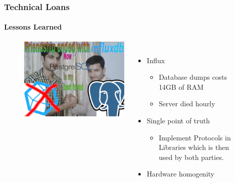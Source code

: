 
\begin{frame}
  \frametitle{Technical Loans}
  \framesubtitle{Lessons Learned}

\begin{figure}
\begin{columns}
\begin{center}
\includegraphics[height=0.65\textheight]{figs/meme_postgres_influx.png}
\end{center}
\raggedright
\vspace{0.5cm}

\begin{itemize}
  \item Influx
        \begin{itemize}
          \item Database dumps costs 14GB of RAM
          \item Server died hourly
        \end{itemize}
    \item Single point of truth
    \begin{itemize}
        \item Implement Protocols in Libraries which is then used by both parties.
    \end{itemize}
    \item Hardware homogenity
\end{itemize}
\end{columns}
\end{figure}

\end{frame}

